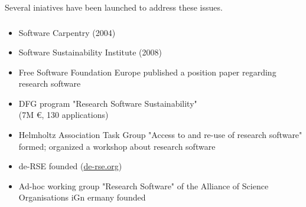 \documentclass{beamer}
\begin{document}
\begin{frame}
  \begin{block}{}
    \begin{center}
      Several iniatives have been launched to address these issues.
    \end{center}
  \end{block}
\end{frame}


\begin{frame}
  \frametitle{}
  \begin{block}{}
    {\normalsize
      \begin{itemize}
      \item Software Carpentry (2004)\pause
      \item Software Sustainability Institute (2008)\pause
      \item Free Software Foundation Europe published a position paper
        regarding research software

        
      \item DFG program "Research Software Sustainability"\\
        (7M €, 130 applications)\pause
      \item Helmholtz Association Task Group "Access to and re-use of
        research software" formed; organized a workshop about
        research software\pause
      \item de-RSE founded (\href{http://de-rse.org}{de-rse.org})\pause
      \item Ad-hoc working group "Research Software" of the Alliance of
        Science Organisations iGn ermany founded
    \end{itemize}
    }
  \end{block}
\end{frame}
\end{document}
